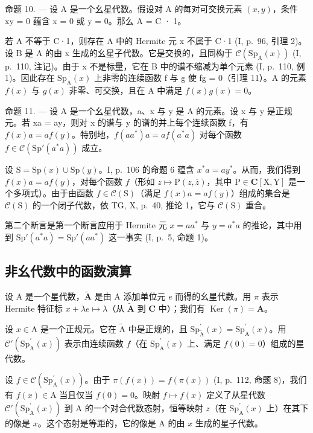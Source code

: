 命题 10. --- 设 A 是一个幺星代数。假设对 A 的每对可交换元素 \((x,y)\)，条件 xy = 0 蕴含 x = 0 或 y = 0。那么 A = C · 1。

若 A 不等于 C·1，则存在 A 中的 Hermite 元 x 不属于 C·1 (I, p.~96, 引理 2)。设 B 是 A 的由 x 生成的幺星子代数。它是交换的，且同构于 \(\mathcal{C}(\mathrm{Sp}_{\mathrm{A}}(x))\) (I, p.~110, 注记)。由于 x 不是标量，它在 B 中的谱不缩减为单个元素 (I, p.~110, 例 1)。因此存在 \(\mathrm{Sp}_{\mathrm{A}}(x)\) 上非零的连续函数 f 与 g 使 fg = 0（引理 11）。A 的元素 \(f(x)\) 与 \(g(x)\) 非零、可交换，且在 A 中满足 \(f(x)g(x) = 0\)。

命题 11. --- 设 A 是一个幺星代数，a、x 与 y 是 A 的元素。设 x 与 y 是正规元。若 xa = ay，则对 x 的谱与 y 的谱的并上每个连续函数 f，有 \(f(x)a = af(y)\)。特别地，\(f(aa^{*})a = af(a^{*}a)\) 对每个函数 \(f \in \mathcal{C}(\mathrm{Sp}'(a^{*}a))\) 成立。

设 \(\mathrm{S} = \mathrm{Sp}(x) \cup \mathrm{Sp}(y)\)。I, p.~106 的命题 6 蕴含 \(x^{*}a = ay^{*}\)。从而，我们得到 \(f(x)a = af(y)\)，对每个函数 \(f\)（形如 \(z \mapsto \mathrm{P}(z,\overline{z})\)，其中 \(\mathrm{P} \in \mathbf{C}[\mathrm{X},\mathrm{Y}]\) 是一个多项式）。由于由函数 \(f \in \mathcal{C}(\mathrm{S})\)（满足 \(f(x)a = af(y)\)）组成的集合是 \(\mathcal{C}(\mathrm{S})\) 的一个闭子代数，依 TG, X, p.~40, 推论 1，它与 \(\mathcal{C}(\mathrm{S})\) 重合。

第二个断言是第一个断言应用于 Hermite 元 \(x = aa^{*}\) 与 \(y = a^{*}a\) 的推论，其中用到 \(\mathrm{Sp}'(a^{*}a) = \mathrm{Sp}'(aa^{*})\) 这一事实 (I, p.~5, 命题 1)。

\subsection{非幺代数中的函数演算}

设 A 是一个星代数，\(\widetilde{\mathbf{A}}\) 是由 A 添加单位元 \(e\) 而得的幺星代数。用 \(\pi\) 表示 Hermite 特征标 \(x + \lambda e \mapsto \lambda\)（从 \(\widetilde{\mathbf{A}}\) 到 \(\mathbf{C}\) 中）；我们有 \(\operatorname{Ker}(\pi) = \mathbf{A}\)。

设 \(x \in \mathrm{A}\) 是一个正规元。它在 \(\widetilde{\mathrm{A}}\) 中是正规的，且 \(\mathrm{Sp}_{\widetilde{\mathrm{A}}}^{\prime}(x) = \mathrm{Sp}_{\mathrm{A}}^{\prime}(x)\)。用 \(\mathcal{C}'(\mathrm{Sp}_{\mathrm{A}}^{\prime}(x))\) 表示由连续函数 \(f\)（在 \(\mathrm{Sp}_{\mathrm{A}}^{\prime}(x)\) 上、满足 \(f(0) = 0\)）组成的星代数。

设 \(f \in \mathcal{C}(\mathrm{Sp}_{\mathrm{A}}^{\prime}(x))\)。由于 \(\pi(f(x)) = f(\pi(x))\) (I, p.~112, 命题 8)，我们有 \(f(x) \in \mathrm{A}\) 当且仅当 \(f(0) = 0\)。映射 \(f \mapsto f(x)\) 定义了从星代数 \(\mathcal{C}'(\mathrm{Sp}_{\mathrm{A}}^{\prime}(x))\) 到 A 的一个对合代数态射，恒等映射 \(z\)（在 \(\mathrm{Sp}_{\mathrm{A}}^{\prime}(x)\) 上）在其下的像是 \(x\)。这个态射是等距的，它的像是 A 的由 \(x\) 生成的星子代数。

